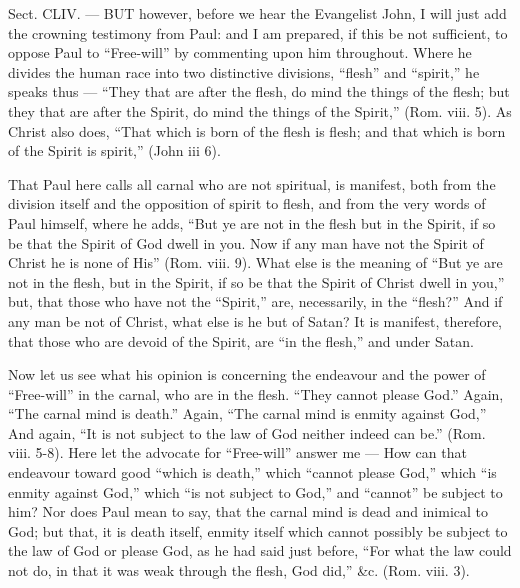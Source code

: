 
Sect. CLIV. — BUT however, before we hear the Evangelist John, I will just add the crowning testimony from Paul: and I am prepared, if this be not sufficient, to oppose Paul to “Free-will” by commenting upon him throughout. Where he divides the human race into two distinctive divisions, “flesh” and “spirit,” he speaks thus — “They that are after the flesh, do mind the things of the flesh; but they that are after the Spirit, do mind the things of the Spirit,” (Rom. viii. 5). As Christ also does, “That which is born of the flesh is flesh; and that which is born of the Spirit is spirit,” (John iii 6).

That Paul here calls all carnal who are not spiritual, is manifest, both from the division itself and the opposition of spirit to flesh, and from the very words of Paul himself, where he adds, “But ye are not in the flesh but in the Spirit, if so be that the Spirit of God dwell in you. Now if any man have not the Spirit of Christ he is none of His” (Rom. viii. 9). What else is the meaning of “But ye are not in the flesh, but in the Spirit, if so be that the Spirit of Christ dwell in you,” but, that those who have not the “Spirit,” are, necessarily, in the “flesh?” And if any man be not of Christ, what else is he but of Satan? It is manifest, therefore, that those who are devoid of the Spirit, are “in the flesh,” and under Satan.

Now let us see what his opinion is concerning the endeavour and the power of “Free-will” in the carnal, who are in the flesh. “They cannot please God.” Again, “The carnal mind is death.” Again, “The carnal mind is enmity against God,” And again, “It is not subject to the law of God neither indeed can be.” (Rom. viii. 5-8). Here let the advocate for “Free-will” answer me — How can that endeavour toward good “which is death,” which “cannot please God,” which “is enmity against God,” which “is not subject to God,” and “cannot” be subject to him? Nor does Paul mean to say, that the carnal mind is dead and inimical to God; but that, it is death itself, enmity itself which cannot possibly be subject to the law of God or please God, as he had said just before, “For what the law could not do, in that it was weak through the flesh, God did,” \&c. (Rom. viii. 3).

